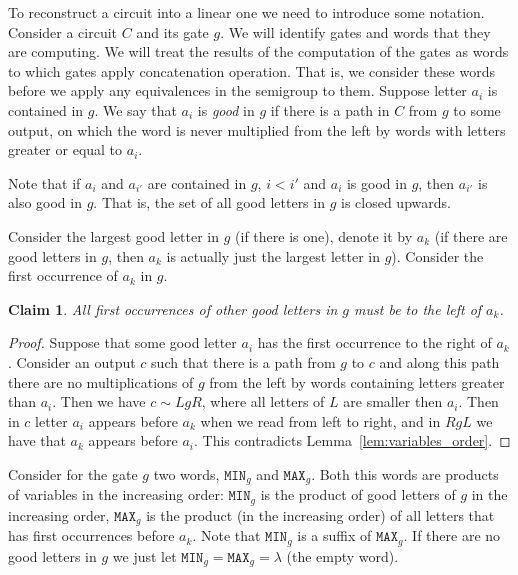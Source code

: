 \documentclass[11pt,letterpaper]{article}
\newtheorem{claim}{Claim}
\newcommand{\mmin}{\texttt{MIN}}
\newcommand{\mmax}{\texttt{MAX}}
\begin{document}

To reconstruct a circuit into a linear one we need to introduce some notation. Consider a circuit $C$ and its gate $g$.
We will identify gates and words that they are computing. We will treat the results of the computation of the gates as words to which gates apply concatenation operation. That is, we consider these words before we apply any equivalences in the semigroup to them.
Suppose letter $a_i$ is contained in $g$. We say that $a_i$ is \emph{good} in $g$ if there is a path in $C$ from $g$ to some output, on which the word is never multiplied from the left by words with letters greater or equal to $a_i$.

Note that if $a_i$ and $a_{i'}$ are contained in $g$, $i<i'$ and $a_i$ is good in $g$, then $a_{i'}$ is also good in $g$. That is, the set of all good letters in $g$ is closed upwards.

Consider the largest good letter in $g$ (if there is one), denote it by $a_k$ (if there are good letters in $g$, then $a_k$ is actually just the largest letter in $g$). Consider the first occurrence of $a_k$ in $g$.

\begin{claim}
All first occurrences of other good letters in $g$ must be to the left of $a_k$.
\end{claim}

\begin{proof}
Suppose that some good letter $a_i$ has the first occurrence to the right of $a_k$. Consider an output $c$ such that there is a path from $g$ to $c$ and along this path there are no multiplications of $g$ from the left by words containing letters greater than $a_i$. Then we have $c \sim LgR$, where all letters of $L$ are smaller then $a_i$. Then in $c$ letter $a_i$ appears before $a_k$ when we read from left to right, and in $RgL$ we have that $a_k$ appears before $a_i$. This contradicts Lemma~\ref{lem:variables_order}.
\end{proof}

Consider for the gate $g$ two words, $\mmin_g$ and $\mmax_g$. Both this words are products of variables in the increasing order: $\mmin_g$ is the product of good letters of $g$ in the increasing order, $\mmax_g$ is the product (in the increasing order) of all letters that has first occurrences before $a_k$. Note that $\mmin_g$ is a suffix of $\mmax_g$. If there are no good letters in $g$ we just let $\mmin_g=\mmax_g=\lambda$ (the empty word).
\end{document}
